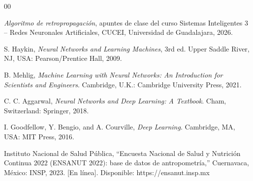 \documentclass[conference]{IEEEtran}
\begin{document}
\begin{thebibliography}{00}

 \textit{Algoritmo de retropropagación}, apuntes de clase del curso Sistemas Inteligentes 3 -- Redes Neuronales Artificiales, CUCEI, Universidad de Guadalajara, 2026.

 S. Haykin, \textit{Neural Networks and Learning Machines}, 3rd ed. Upper Saddle River, NJ, USA: Pearson/Prentice Hall, 2009.

 B. Mehlig, \textit{Machine Learning with Neural Networks: An Introduction for Scientists and Engineers}. Cambridge, U.K.: Cambridge University Press, 2021.

 C. C. Aggarwal, \textit{Neural Networks and Deep Learning: A Textbook}. Cham, Switzerland: Springer, 2018.

 I. Goodfellow, Y. Bengio, and A. Courville, \textit{Deep Learning}. Cambridge, MA, USA: MIT Press, 2016.

 Instituto Nacional de Salud Pública, ``Encuesta Nacional de Salud y Nutrición Continua 2022 (ENSANUT 2022): base de datos de antropometría,'' Cuernavaca, México: INSP, 2023. [En línea]. Disponible: https://ensanut.insp.mx

\end{thebibliography}
\end{document}
